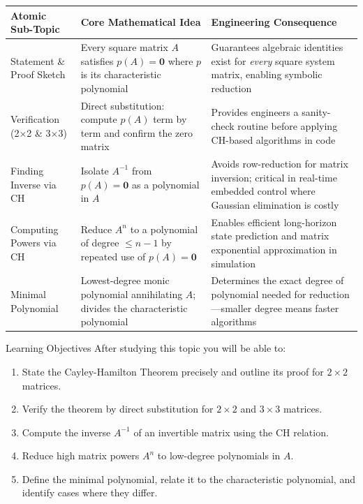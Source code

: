\documentclass[12pt,a4paper]{article}
\begin{document}
\begin{center}
\begin{tabular}{@{}p{3.8cm} p{5.2cm} p{6cm}@{}}
\toprule
\textbf{Atomic Sub-Topic} & \textbf{Core Mathematical Idea} & \textbf{Engineering Consequence} \\
\midrule
Statement \& Proof Sketch &
Every square matrix $A$ satisfies $p(A)=\mathbf{0}$ where $p$ is its characteristic polynomial &
Guarantees algebraic identities exist for \emph{every} square system matrix, enabling symbolic reduction \\
\addlinespace
Verification (2\(\times\)2 \& 3\(\times\)3) &
Direct substitution: compute $p(A)$ term by term and confirm the zero matrix &
Provides engineers a sanity-check routine before applying CH-based algorithms in code \\
\addlinespace
Finding Inverse via CH &
Isolate $A^{-1}$ from $p(A)=\mathbf{0}$ as a polynomial in $A$ &
Avoids row-reduction for matrix inversion; critical in real-time embedded control where Gaussian elimination is costly \\
\addlinespace
Computing Powers via CH &
Reduce $A^{n}$ to a polynomial of degree $\leq n-1$ by repeated use of $p(A)=\mathbf{0}$ &
Enables efficient long-horizon state prediction and matrix exponential approximation in simulation \\
\addlinespace
Minimal Polynomial &
Lowest-degree monic polynomial annihilating $A$; divides the characteristic polynomial &
Determines the exact degree of polynomial needed for reduction---smaller degree means faster algorithms \\
\bottomrule
\end{tabular}
\end{center}

\begin{learnbox}{Learning Objectives}
After studying this topic you will be able to:
\begin{enumerate}
  \item State the Cayley-Hamilton Theorem precisely and outline its proof for $2\times 2$ matrices.
  \item Verify the theorem by direct substitution for $2\times 2$ and $3\times 3$ matrices.
  \item Compute the inverse $A^{-1}$ of an invertible matrix using the CH relation.
  \item Reduce high matrix powers $A^{n}$ to low-degree polynomials in $A$.
  \item Define the minimal polynomial, relate it to the characteristic polynomial, and identify cases where they differ.
\end{enumerate}
\end{learnbox}
\end{document}
